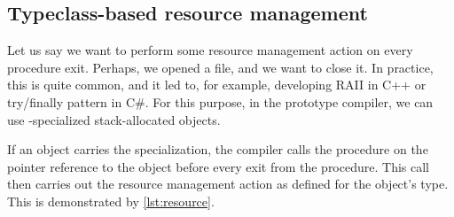 \subsection{Typeclass-based resource management}
\label{sec:tcResMan}

Let us say we want to perform some resource management action on every procedure exit. Perhaps, we opened a file, and we want to close it. In practice, this is quite common, and it led to, for example, developing RAII in C++ or try/finally pattern in C\#. For this purpose, in the prototype compiler, we can use -specialized stack-allocated objects.

If an object carries the  specialization, the compiler calls the  procedure on the pointer reference to the object before every exit from the procedure. This  call then carries out the resource management action as defined for the object's type. This is demonstrated by \cref{lst:resource}.

